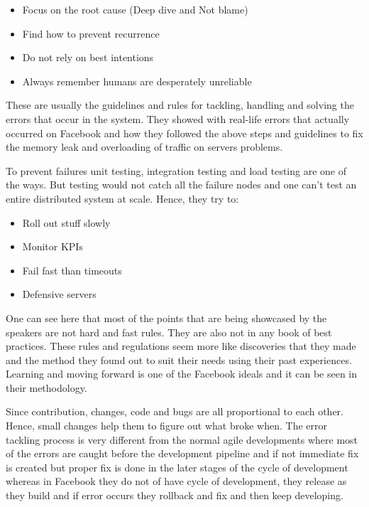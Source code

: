 \begin{itemize}
      \item Focus on the root cause (Deep dive and Not blame)
      \item Find how to prevent recurrence
      \item Do not rely on best intentions
      \item Always remember humans are desperately unreliable      
\end{itemize}

These are usually the guidelines and rules for tackling, handling and solving the errors that occur in the system. They showed with real-life errors that actually occurred on Facebook and how they followed the above steps and guidelines to fix the memory leak and overloading of traffic on servers problems.

To prevent failures unit testing, integration testing and load testing are one of the ways. But testing would not catch all the failure nodes and one can't test an entire distributed system at scale. Hence, they try to:
\begin{itemize}
      \item Roll out stuff slowly
      \item Monitor KPIs
      \item Fail fast than timeouts
      \item Defensive servers
\end{itemize}

One can see here that most of the points that are being showcased by the speakers are not hard and fast rules. They are also not in any book of best practices. These rules and regulations seem more like discoveries that they made and the method they found out to suit their needs using their past experiences. Learning and moving forward is one of the Facebook ideals and it can be seen in their methodology.

Since contribution, changes, code and bugs are all proportional to each other. Hence, small changes help them to figure out what broke when. The error tackling process is very different from the normal agile developments where most of the errors are caught before the development pipeline and if not immediate fix is created but proper fix is done in the later stages of the cycle of development whereas in Facebook they do not of have cycle of development, they release as they build and if error occurs they rollback and fix and then keep developing.

